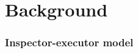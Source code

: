 \documentclass[thesis]{subfiles}
\begin{document}
\chapter{Background}
\label{chapter:background}










\subsection{Inspector-executor model}
\cite{knepleyExascaleComputingThreads2015} %
\end{document}
